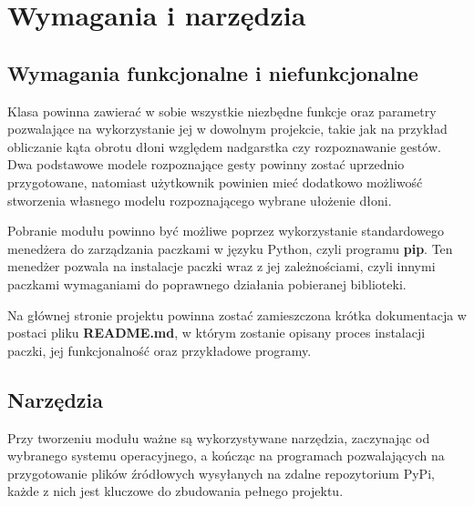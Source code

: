 \chapter{Wymagania i narzędzia}



\section{Wymagania funkcjonalne i niefunkcjonalne}

\quad Klasa powinna zawierać w sobie wszystkie niezbędne funkcje oraz parametry pozwalające na wykorzystanie jej w dowolnym projekcie, takie jak na przykład obliczanie kąta obrotu dłoni względem nadgarstka czy rozpoznawanie gestów. Dwa podstawowe modele rozpoznające gesty powinny zostać uprzednio przygotowane, natomiast użytkownik powinien mieć dodatkowo możliwość stworzenia własnego modelu rozpoznającego wybrane ułożenie dłoni. 

\quad Pobranie modułu powinno być możliwe poprzez wykorzystanie standardowego menedżera do zarządzania paczkami w języku Python, czyli programu \textbf{pip}. Ten menedżer pozwala na instalacje paczki wraz z jej zależnościami, czyli innymi paczkami wymaganiami do poprawnego działania pobieranej biblioteki. 

\quad Na głównej stronie projektu powinna zostać zamieszczona krótka dokumentacja w postaci pliku \textbf{README.md}, w którym zostanie opisany proces instalacji paczki, jej funkcjonalność oraz przykładowe programy. 

\section{Narzędzia}

\quad Przy tworzeniu modułu ważne są wykorzystywane narzędzia, zaczynając od wybranego systemu operacyjnego, a kończąc na programach pozwalających na przygotowanie plików źródłowych wysyłanych na zdalne repozytorium PyPi, każde z nich jest kluczowe do zbudowania pełnego projektu. 

